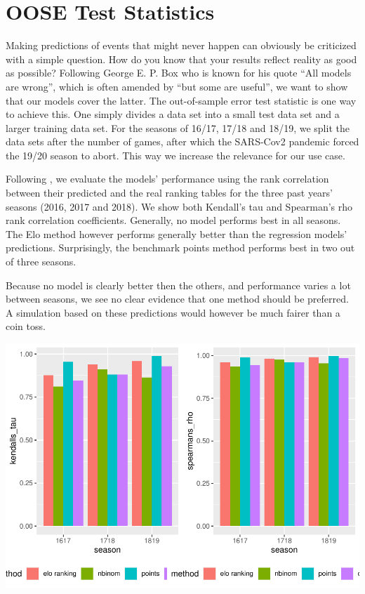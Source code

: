 \documentclass[12pt,a4paper]{article}
\begin{document}
\hypertarget{oose-test-statistics}{%
\section{OOSE Test Statistics}\label{oose-test-statistics}}

Making predictions of events that might never happen can obviously be
criticized with a simple question. How do you know that your results
reflect reality as good as possible? Following George E. P. Box who is
known for his quote \enquote{All models are wrong}, which is often
amended by \enquote{but some are useful}, we want to show that our
models cover the latter. The out-of-sample error test statistic is one
way to achieve this. One simply divides a data set into a small test
data set and a larger training data set. For the seasons of 16/17, 17/18
and 18/19, we split the data sets after the number of games, after which
the SARS-Cov2 pandemic forced the 19/20 season to abort. This way we
increase the relevance for our use case.

Following \textcite{leitner2010}, we evaluate the models' performance
using the rank correlation between their predicted and the real ranking
tables for the three past years' seasons (2016, 2017 and 2018). We show
both Kendall's tau and Spearman's rho rank correlation coefficients.
Generally, no model performs best in all seasons. The Elo method however
performs generally better than the regression models' predictions.
Surprisingly, the benchmark points method performs best in two out of
three seasons.

Because no model is clearly better then the others, and performance
varies a lot between seasons, we see no clear evidence that one method
should be preferred. A simulation based on these predictions would
however be much fairer than a coin toss.



\includegraphics{term_paper_eem_files/figure-latex/unnamed-chunk-10-1.pdf}
\end{document}
